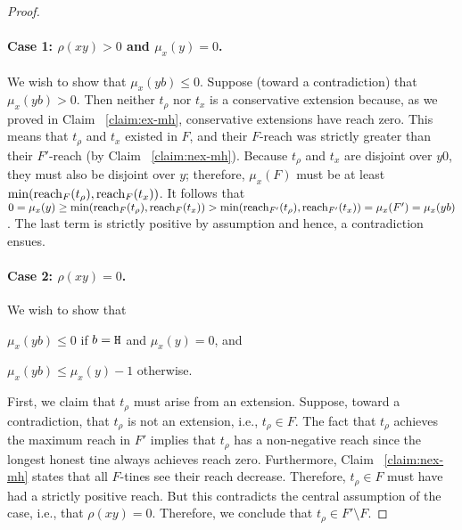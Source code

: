 \begin{proof}
  \paragraph{Case 1: $\rho(xy)>0$ and $\mu_x(y)=0$.} 
    We wish to show that $\mu_x(yb) \leq 0$.
    Suppose (toward a contradiction) that $\mu_x(yb) > 0$. 
    Then neither $t_\rho$ nor $t_x$ is a conservative extension because, as we proved in Claim ~\ref{claim:ex-mh}, conservative extensions have reach zero. This means that $t_\rho$ and $t_x$ existed in $F$, and their $F$-reach was strictly greater than their $F'$-reach (by Claim ~\ref{claim:nex-mh}). 
    Because $t_\rho$ and $t_x$ 
    are 
    disjoint over $y0$, they must also be disjoint over $y$; therefore, $\mu_x(F)$ must be at least $\min(\operatorname{reach}_F(t_\rho),\operatorname{reach}_F(t_x))$. 
    It follows that 
    $0 
    = \mu_x(y) 
    \geq \min(\operatorname{reach}_F(t_\rho),\operatorname{reach}_F(t_x))
    > \min(\operatorname{reach}_{F'}(t_\rho),\operatorname{reach}_{F'}(t_x))
    = \mu_x(F') = \mu_x(yb)
    $. 
    The last term is strictly positive by assumption and hence, a contradiction ensues.

  \paragraph{Case 2: $\rho(xy)=0$.}
    We wish to show that 
    \begin{enumerate*}[label=(\textit{\roman*})]
      \item $\mu_x(yb) \leq 0$ if $b = \mathtt{H}$ and $\mu_x(y) = 0$, and 
      \item $\mu_x(yb) \leq \mu_x(y) - 1$ otherwise.
    \end{enumerate*}
    First, we claim that $t_\rho$ must arise from an extension. 
    Suppose, toward a contradiction, that $t_\rho$ is not an extension, 
    i.e., $t_\rho \in F$. 
    The fact that $t_\rho$ achieves the maximum reach in $F'$ 
    implies that 
    $t_\rho$ has a non-negative reach 
    since the longest honest tine always achieves reach zero. 
    Furthermore, 
    Claim ~\ref{claim:nex-mh} states that 
    all $F$-tines see their reach decrease. 
    Therefore, $t_\rho \in F$ must have had a strictly positive reach. 
    But this contradicts the central assumption of the case, i.e., 
    that $\rho(xy)=0$. 
    Therefore, we conclude that $t_\rho \in F' \setminus F$.


\end{proof}
